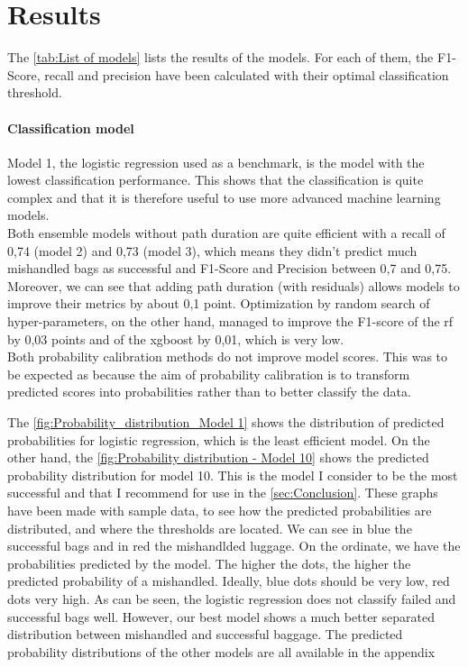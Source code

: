 \documentclass[12pt]{article}
\begin{document}
\newpage
\section{Results}

The \autoref{tab:List of models} lists the results of the models. For each of them, the F1-Score, recall and precision have been calculated with their optimal classification threshold.

\paragraph{Classification model}
Model 1, the logistic regression used as a benchmark, is the model with the lowest classification performance. This shows that the classification is quite complex and that it is therefore useful to use more advanced machine learning models.\\
Both ensemble models without path duration are quite efficient with a recall of 0,74 (model 2) and 0,73 (model 3), which means they didn't predict much mishandled bags as successful and F1-Score and Precision between 0,7 and 0,75. 
Moreover, we can see that adding path duration (with residuals) allows models to improve their metrics by about 0,1 point.
Optimization by random search of hyper-parameters, on the other hand, managed to improve the F1-score of the \acrshort{rf} by 0,03 points and of the \acrshort{xgboost} by 0,01, which is very low. \\
Both probability calibration methods do not improve model scores.  This was to be expected as because the aim of probability calibration is to transform predicted scores into probabilities rather than to better classify the data.\hfill \break

The \autoref{fig:Probability_distribution_Model 1} shows the distribution of predicted probabilities for logistic regression, which is the least efficient model.
On the other hand, the \autoref{fig:Probability distribution - Model 10} shows the predicted probability distribution for model 10. This is the model I consider to be the most successful and that I recommend for use in the \autoref{sec:Conclusion}. These graphs have been made with sample data, to see how the predicted probabilities are distributed, and where the thresholds are located. 
We can see in blue the successful bags and in red the mishandlded luggage. On the ordinate, we have the probabilities predicted by the model. 
The higher the dots, the higher the predicted probability of a mishandled. Ideally, blue dots should be very low, red dots very high. 
As can be seen, the logistic regression does not classify failed and successful bags well. However, our best model shows a much better separated distribution between mishandled and successful baggage. The predicted probability distributions of the other models are all available in the appendix
\end{document}
